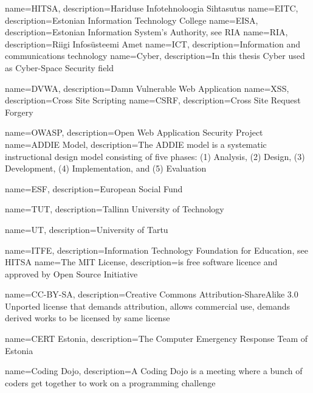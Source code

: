 {
  name=HITSA,
  description={Hariduse Infotehnoloogia Sihtasutus}
}
{
  name=EITC,
  description={Estonian Information Technology College}
}
{
  name=EISA,
  description={Estonian Information System’s Authority, see \gls{RIA}}
}
{
  name=RIA,
  description={Riigi Infosüsteemi Amet}
}
{
  name=ICT,
  description={Information and communications technology}
}
{
  name=Cyber,
  description={In this thesis Cyber used as Cyber-Space Security field}
}
 
{
  name=DVWA,
  description={Damn Vulnerable Web Application}
}
{
  name=XSS,
  description={Cross Site Scripting}
}
{
  name=CSRF,
  description={Cross Site Request Forgery}
}
 
{
  name=OWASP,
  description={Open Web Application Security Project}
}
{
  name=ADDIE Model,
  description={The ADDIE model is a systematic instructional design model consisting of five phases: (1) Analysis, (2) Design, (3) Development, (4) Implementation, and (5) Evaluation}
} 


{
  name=ESF,
  description={European Social Fund}
} 


{
  name=TUT,
  description={Tallinn University of Technology}
} 


{
  name=UT,
  description={University of Tartu}
} 


{
  name=ITFE,
  description={Information Technology Foundation for Education, see \gls{HITSA}}
} 
{
  name=The MIT License,
  description={is free software licence and approved by Open Source Initiative}
} 


{
  name=CC-BY-SA,
  description={Creative Commons Attribution-ShareAlike 3.0 Unported license that demands attribution, allows commercial use, demands derived works to be licensed by same license}
} 


{
  name=CERT Estonia,
  description={The Computer Emergency Response Team of Estonia}
}

{
  name=Coding Dojo,
  description={A Coding Dojo is a meeting where a bunch of coders get together to work on a programming challenge}
}